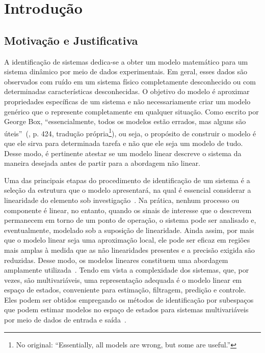 \chapter{Introdução}
\label{cap:intro} \vspace{-1cm} \vspace{1cm}


\section{Motivação e Justificativa} 
\label{sec:intro_motiva}
%
\par
A identificação de sistemas dedica-se a obter um modelo matemático para um sistema dinâmico por meio de dados experimentais. Em geral, esses dados são observados com ruído em um sistema físico completamente desconhecido ou com determinadas características desconhecidas. O objetivo do modelo é aproximar propriedades específicas de um sistema e não necessariamente criar um modelo genérico que o represente completamente em qualquer situação. Como escrito por George Box, ``essencialmente, todos os modelos estão errados, mas alguns são úteis''~(\citealp{box1987}, p. 424, tradução própria\footnote{No original: ``Essentially, all models are wrong, but some are useful.''}), ou seja, o propósito de construir o modelo é que ele sirva para determinada tarefa e não que ele seja um modelo de tudo. Desse modo, é pertinente atestar se um modelo linear descreve o sistema da maneira desejada antes de partir para a abordagem não linear.
\par 
Uma das principais etapas do procedimento de identificação de um sistema é a seleção da estrutura que o modelo apresentará, na qual é essencial considerar a linearidade do elemento sob investigação~\citep{aguirre2015,nelles2020}. Na prática, nenhum processo ou componente é linear, no entanto, quando os sinais de interesse que o descrevem permanecem em torno de um ponto de operação, o sistema pode ser analisado e, eventualmente, modelado sob a suposição de linearidade. Ainda assim, por mais que o modelo linear seja uma aproximação local, ele pode ser eficaz em regiões mais amplas à medida que as não linearidades presentes e a precisão exigida são reduzidas. Desse modo, os modelos lineares constituem uma abordagem amplamente utilizada~\citep{sastry2013}. Tendo em vista a complexidade dos sistemas, que, por vezes, são multivariáveis, uma representação adequada é o modelo linear em espaço de estados, conveniente para estimação, filtragem, predição e controle. Eles podem ser obtidos empregando os métodos de identificação por subespaços que podem estimar modelos no espaço de estados para sistemas multivariáveis por meio de dados de entrada e saída~\citep{katayama2005,van2012}. 
